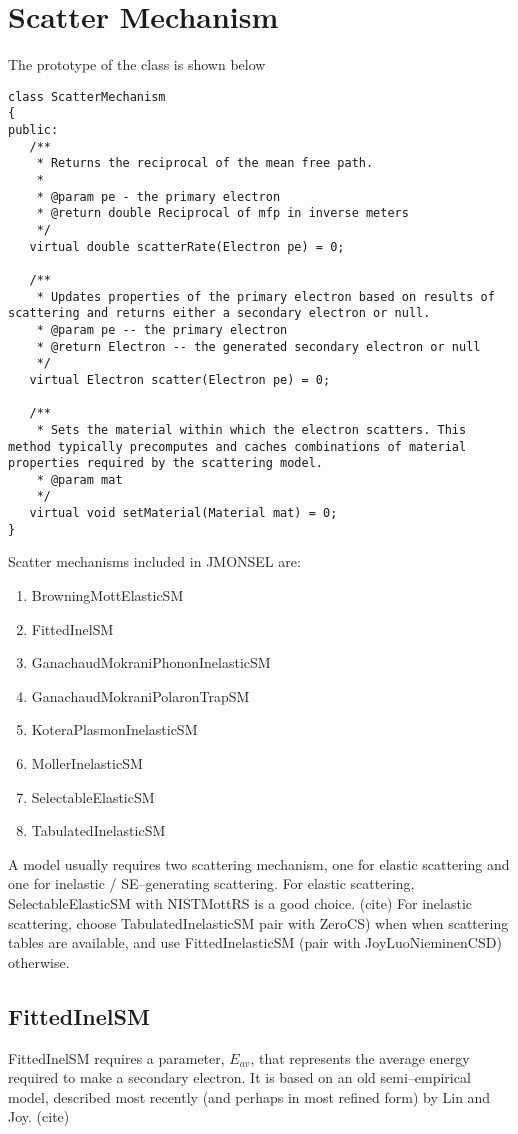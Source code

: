 \section{Scatter Mechanism}\label{impl:sm}
The prototype of the class is shown below
\begin{lstlisting}
class ScatterMechanism
{
public:
   /**
    * Returns the reciprocal of the mean free path.
    *
    * @param pe - the primary electron
    * @return double Reciprocal of mfp in inverse meters
    */
   virtual double scatterRate(Electron pe) = 0;

   /**
    * Updates properties of the primary electron based on results of scattering and returns either a secondary electron or null.
    * @param pe -- the primary electron
    * @return Electron -- the generated secondary electron or null
    */
   virtual Electron scatter(Electron pe) = 0;

   /**
    * Sets the material within which the electron scatters. This method typically precomputes and caches combinations of material properties required by the scattering model.
    * @param mat
    */
   virtual void setMaterial(Material mat) = 0;
}
\end{lstlisting}

Scatter mechanisms included in JMONSEL are:
\begin{enumerate}
\item BrowningMottElasticSM
\item FittedInelSM
\item GanachaudMokraniPhononInelasticSM
\item GanachaudMokraniPolaronTrapSM
\item KoteraPlasmonInelasticSM
\item MollerInelasticSM
\item SelectableElasticSM
\item TabulatedInelasticSM
\end{enumerate}

A model usually requires two scattering mechanism, one for elastic scattering and one for inelastic / SE--generating scattering. For elastic scattering, SelectableElasticSM with NISTMottRS is a good choice. (cite) For inelastic scattering, choose TabulatedInelasticSM pair with ZeroCS) when when scattering tables are available, and use FittedInelasticSM (pair with JoyLuoNieminenCSD) otherwise.

\subsection{FittedInelSM}
FittedInelSM requires a parameter, $E_{av}$, that represents the average energy required to make a secondary electron. It is based on an old semi--empirical model, described most recently (and perhaps in most refined form) by Lin and Joy. (cite)

